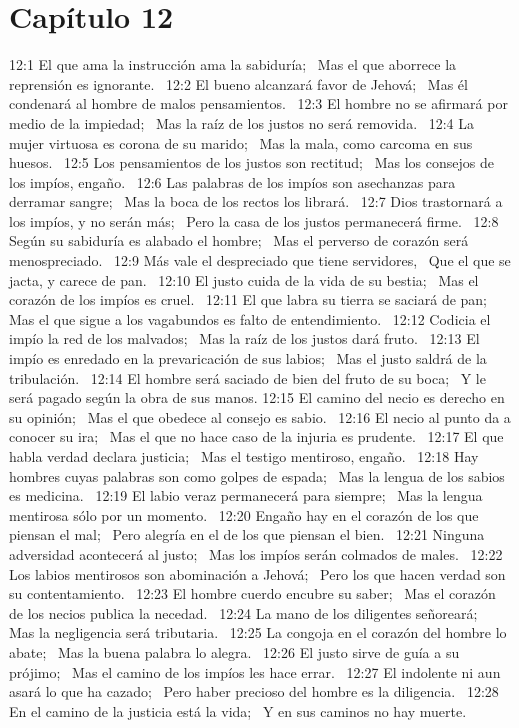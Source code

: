 \section*{Capítulo 12 }
12:1 El que ama la instrucción ama la sabiduría;  
Mas el que aborrece la reprensión es ignorante.  
12:2 El bueno alcanzará favor de Jehová;  
Mas él condenará al hombre de malos pensamientos.  
12:3 El hombre no se afirmará por medio de la impiedad;  
Mas la raíz de los justos no será removida.  
12:4 La mujer virtuosa es corona de su marido;  
Mas la mala, como carcoma en sus huesos.  
12:5 Los pensamientos de los justos son rectitud;  
Mas los consejos de los impíos, engaño.  
12:6 Las palabras de los impíos son asechanzas para derramar sangre;  
Mas la boca de los rectos los librará.  
12:7 Dios trastornará a los impíos, y no serán más;  
Pero la casa de los justos permanecerá firme.  
12:8 Según su sabiduría es alabado el hombre;  
Mas el perverso de corazón será menospreciado.  
12:9 Más vale el despreciado que tiene servidores,  
Que el que se jacta, y carece de pan.  
12:10 El justo cuida de la vida de su bestia;  
Mas el corazón de los impíos es cruel.  
12:11 El que labra su tierra se saciará de pan;  
Mas el que sigue a los vagabundos es falto de entendimiento.  
12:12 Codicia el impío la red de los malvados;  
Mas la raíz de los justos dará fruto.  
12:13 El impío es enredado en la prevaricación de sus labios;  
Mas el justo saldrá de la tribulación.  
12:14 El hombre será saciado de bien del fruto de su boca;  
Y le será pagado según la obra de sus manos. 
12:15 El camino del necio es derecho en su opinión;  
Mas el que obedece al consejo es sabio.  
12:16 El necio al punto da a conocer su ira;  
Mas el que no hace caso de la injuria es prudente.  
12:17 El que habla verdad declara justicia;  
Mas el testigo mentiroso, engaño.  
12:18 Hay hombres cuyas palabras son como golpes de espada;  
Mas la lengua de los sabios es medicina.  
12:19 El labio veraz permanecerá para siempre;  
Mas la lengua mentirosa sólo por un momento.  
12:20 Engaño hay en el corazón de los que piensan el mal;  
Pero alegría en el de los que piensan el bien.  
12:21 Ninguna adversidad acontecerá al justo;  
Mas los impíos serán colmados de males.  
12:22 Los labios mentirosos son abominación a Jehová;  
Pero los que hacen verdad son su contentamiento.  
12:23 El hombre cuerdo encubre su saber;  
Mas el corazón de los necios publica la necedad.  
12:24 La mano de los diligentes señoreará;  
Mas la negligencia será tributaria.  
12:25 La congoja en el corazón del hombre lo abate;  
Mas la buena palabra lo alegra.  
12:26 El justo sirve de guía a su prójimo;  
Mas el camino de los impíos les hace errar.  
12:27 El indolente ni aun asará lo que ha cazado;  
Pero haber precioso del hombre es la diligencia.  
12:28 En el camino de la justicia está la vida;  
Y en sus caminos no hay muerte.  
